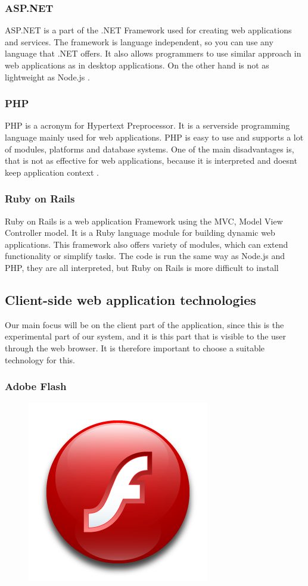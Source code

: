 \subsubsection*{ASP.NET}
ASP.NET is a part of the .NET Framework used for creating web applications and services. The framework is language independent, so you can use any language that .NET offers. It also allows programmers to use similar approach in web applications as in desktop applications. On the other hand is not as lightweight as Node.js \cite{aspnet-about}.

\subsubsection*{PHP}
PHP is a acronym for Hypertext Preprocessor. It is a serverside programming language mainly used for web applications. PHP is easy to use and supports a lot of modules, platforms and database systems. One of the main disadvantages is, that is not as effective for web applications, because it is interpreted and doesnt keep application context \cite{php-whatis}.

\subsubsection*{Ruby on Rails}
Ruby on Rails is a web application Framework using the MVC, Model View Controller model. It is a Ruby language module for building dynamic web applications. This framework also offers variety of modules, which can extend functionality or simplify tasks. The code is run the same way as Node.js and PHP, they are all interpreted, but Ruby on Rails is more difficult to install \cite{ror-about}


\subsection{Client-side web application technologies}
Our main focus will be on the client part of the application, since this is the experimental part of our system, and it is this part that is visible to the user through the web browser. It is therefore important to choose a suitable technology for this.

\subsubsection{Adobe Flash}

\begin{figure}
\vspace{-30pt}
\centering
\includegraphics[width = .10\textwidth]{image/flash-logo.png}
\end{figure}


